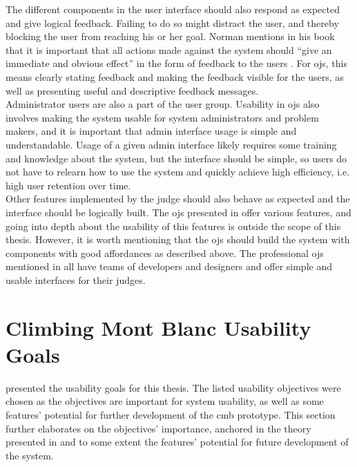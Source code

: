 The different components in the user interface should also respond as expected and give logical feedback. Failing to do so might distract the user, and thereby blocking the user from reaching his or her goal. Norman mentions in his book that it is important that all actions made against the system should ``give an immediate and obvious effect'' in the form of feedback to the users \cite{norman1988design}. For \glspl{oj}, this means clearly stating feedback and making the feedback visible for the users, as well as presenting useful and descriptive feedback messages.\\

Administrator users are also a part of the user group. Usability in \glspl{oj} also involves making the system usable for system administrators and problem makers, and it is important that admin interface usage is simple and understandable. Usage of a given admin interface likely requires some training and knowledge about the system, but the interface should be simple, so users do not have to relearn how to use the system and quickly achieve high efficiency, i.e. high user retention over time. \\

Other features implemented by the judge should also behave as expected and the interface should be logically built. The \glspl{oj} presented in  offer various features, and going into depth about the usability of this features is outside the scope of this thesis. However, it is worth mentioning that the \glspl{oj} should build the system with components with good affordances as described above. The professional \glspl{oj} mentioned in  all have teams of developers and designers and offer simple and usable interfaces for their judges.

\section{Climbing Mont Blanc Usability Goals}
\label{sec:cmb-usability}
 presented the usability goals for this thesis. The listed usability objectives were chosen as the objectives are important for system usability, as well as some features' potential for further development of the \gls{cmb} prototype. This section further elaborates on the objectives' importance, anchored in the theory presented in  and to some extent the features' potential for future development of the system.

